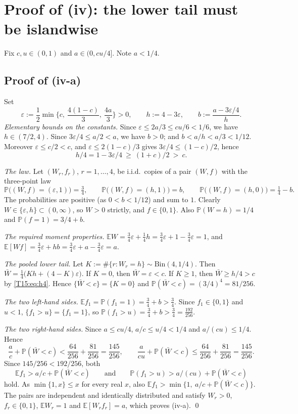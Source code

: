 \documentclass[11pt]{report}
\begin{document}
\section{Proof of (iv): the lower tail must be islandwise}

Fix $c,u\in(0,1)$ and $a\in(0,cu/4]$. Note $a<1/4$.

\subsection{Proof of (iv-a)}
Set
\[
  \varepsilon:=\frac12\min\Big\{c,\ \frac{4(1-c)}3,\ \frac{4a}3\Big\}>0,\qquad
  h:=4-3\varepsilon,\qquad
  b:=\frac{a-3\varepsilon/4}{h}.
\]
\emph{Elementary bounds on the constants.} Since $\varepsilon\le 2a/3\le cu/6<1/6$, we have $h\in(7/2,4)$. Since
$3\varepsilon/4\le a/2<a$, we have $b>0$; and $b<a/h<a/3<1/12$. Moreover $\varepsilon\le c/2<c$, and
$\varepsilon\le 2(1-c)/3$ gives $3\varepsilon/4\le(1-c)/2$, hence
\begin{equation}\label{T15:eq:h4}
  h/4=1-3\varepsilon/4\ \ge\ (1+c)/2\ >\ c .
\end{equation}

\emph{The law.} Let $(W_r,f_r)$, $r=1,\dots,4$, be i.i.d.\ copies of a pair $(W,f)$ with the three-point law
\[
  \mathbb P\big((W,f)=(\varepsilon,1)\big)=\tfrac34,\qquad
  \mathbb P\big((W,f)=(h,1)\big)=b,\qquad
  \mathbb P\big((W,f)=(h,0)\big)=\tfrac14-b .
\]
The probabilities are positive (as $0<b<1/12$) and sum to $1$. Clearly $W\in\{\varepsilon,h\}\subset(0,\infty)$, so
$W>0$ strictly, and $f\in\{0,1\}$. Also $\mathbb P(W=h)=1/4$ and $\mathbb P(f=1)=3/4+b$.

\emph{The required moment properties.}
$\mathbb E W=\tfrac34\varepsilon+\tfrac14h=\tfrac34\varepsilon+1-\tfrac34\varepsilon=1$, and
$\mathbb E[Wf]=\tfrac34\varepsilon+hb=\tfrac34\varepsilon+a-\tfrac34\varepsilon=a$.

\emph{The pooled lower tail.} Let $K:=\#\{r:W_r=h\}\sim\mathrm{Bin}(4,1/4)$. Then
$\bar W=\tfrac14\big(Kh+(4-K)\varepsilon\big)$. If $K=0$, then $\bar W=\varepsilon<c$. If $K\ge1$, then
$\bar W\ge h/4>c$ by \eqref{T15:eq:h4}. Hence $\{\bar W<c\}=\{K=0\}$ and $\mathbb P(\bar W<c)=(3/4)^4=81/256$.

\emph{The two left-hand sides.} $\mathbb E f_1=\mathbb P(f_1=1)=\tfrac34+b>\tfrac34$. Since $f_1\in\{0,1\}$ and
$u<1$, $\{f_1>u\}=\{f_1=1\}$, so $\mathbb P(f_1>u)=\tfrac34+b>\tfrac34=\tfrac{192}{256}$.

\emph{The two right-hand sides.} Since $a\le cu/4$, $a/c\le u/4<1/4$ and $a/(cu)\le1/4$. Hence
\[
  \frac ac+\mathbb P(\bar W<c)<\frac{64}{256}+\frac{81}{256}=\frac{145}{256},\qquad
  \frac a{cu}+\mathbb P(\bar W<c)\le\frac{64}{256}+\frac{81}{256}=\frac{145}{256}.
\]
Since $145/256<192/256$, both
\[
  \mathbb E f_1> a/c+\mathbb P(\bar W<c)\qquad\text{and}\qquad \mathbb P(f_1>u)>a/(cu)+\mathbb P(\bar W<c)
\]
hold. As $\min\{1,x\}\le x$ for every real $x$, also $\mathbb E f_1>\min\{1,\ a/c+\mathbb P(\bar W<c)\}$. The pairs are
independent and identically distributed and satisfy $W_r>0$, $f_r\in\{0,1\}$, $\mathbb E W_r=1$ and
$\mathbb E[W_rf_r]=a$, which proves (iv-a). \qed
\end{document}
